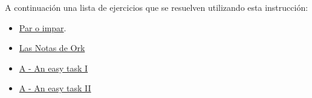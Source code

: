 A continuación una lista de ejercicios que se resuelven utilizando esta instrucción:

\begin{itemize}
	\item \href{https://dmoj.uclv.edu.cu/problem/evenodd} {Par o impar}.
	\item \href{https://dmoj.uclv.edu.cu/problem/notasork} {Las Notas de Ork}
	\item \href{https://matcomgrader.com/problem/9585/an-easy-task-i/}{A - An easy task I}
	\item \href{https://matcomgrader.com/problem/9587/an-easy-task-ii/}{A - An easy task II}
\end{itemize}